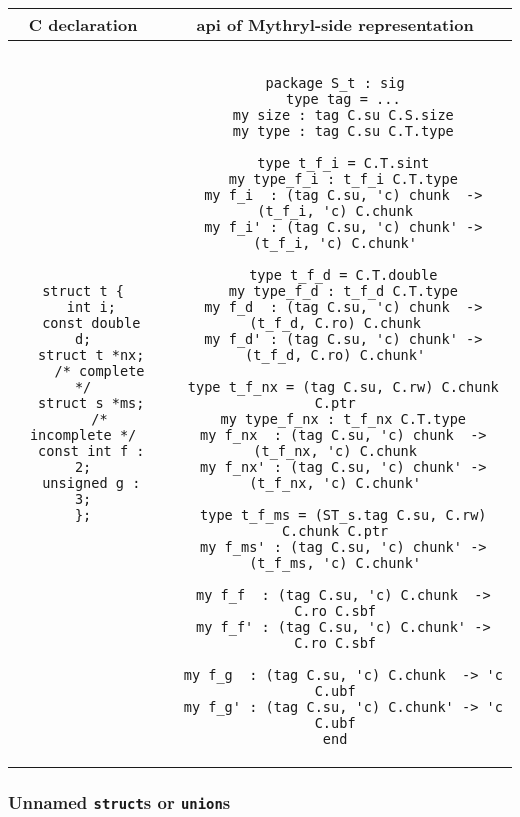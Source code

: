 \begin{small}
\begin{center}
\begin{tabular}{c|c}
C declaration & api of Mythryl-side representation \\ \hline\hline
\begin{minipage}{2in}
\begin{verbatim}
struct t {
  int i;
  const double d;
  struct t *nx;
    /* complete */
  struct s *ms;
    /* incomplete */
  const int f : 2;
  unsigned g : 3;
};
\end{verbatim}
\end{minipage}
&
\begin{minipage}{4in}
\begin{verbatim}

package S_t : sig
  type tag = ...
  my size : tag C.su C.S.size
  my type : tag C.su C.T.type

  type t_f_i = C.T.sint
  my type_f_i : t_f_i C.T.type
  my f_i  : (tag C.su, 'c) chunk  -> (t_f_i, 'c) C.chunk
  my f_i' : (tag C.su, 'c) chunk' -> (t_f_i, 'c) C.chunk'

  type t_f_d = C.T.double
  my type_f_d : t_f_d C.T.type
  my f_d  : (tag C.su, 'c) chunk  -> (t_f_d, C.ro) C.chunk
  my f_d' : (tag C.su, 'c) chunk' -> (t_f_d, C.ro) C.chunk'

  type t_f_nx = (tag C.su, C.rw) C.chunk C.ptr
  my type_f_nx : t_f_nx C.T.type
  my f_nx  : (tag C.su, 'c) chunk  -> (t_f_nx, 'c) C.chunk
  my f_nx' : (tag C.su, 'c) chunk' -> (t_f_nx, 'c) C.chunk'

  type t_f_ms = (ST_s.tag C.su, C.rw) C.chunk C.ptr
  my f_ms' : (tag C.su, 'c) chunk' -> (t_f_ms, 'c) C.chunk'

  my f_f  : (tag C.su, 'c) C.chunk  -> C.ro C.sbf
  my f_f' : (tag C.su, 'c) C.chunk' -> C.ro C.sbf

  my f_g  : (tag C.su, 'c) C.chunk  -> 'c C.ubf
  my f_g' : (tag C.su, 'c) C.chunk' -> 'c C.ubf
end

\end{verbatim}
\end{minipage}
\end{tabular}
\end{center}
\end{small}

\subsubsection*{Unnamed {\tt struct}s or {\tt union}s}

